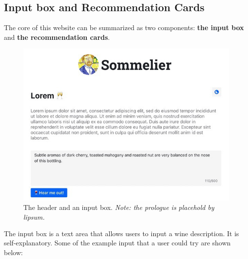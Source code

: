 \documentclass[
	a4paper,
	fontsize=10pt, %
	twoside=false, %
	secnumdepth=2, %
]{kaohandt}
\begin{document}
\subsection{Input box and Recommendation Cards}

The core of this website can be summarized as two components: \textbf{the input box} and \textbf{the recommendation cards}.

\begin{figure}[h]
	\includegraphics[]{sommelier-view-03.jpg}
	\caption{The header and an input box. \emph{Note: the prologue is placehold by lipsum.}}
	\label{fig:app_input}
\end{figure}

The input box is a text area that allows users to input a wine description. It is self-explanatory. Some of the example input that a user could try are shown below:
\end{document}

